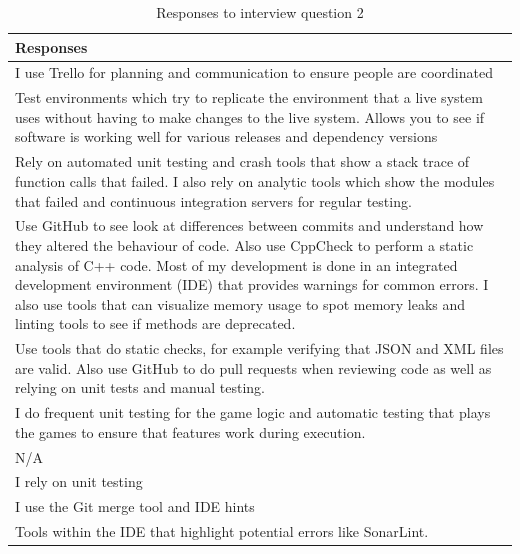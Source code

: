\documentclass[../main.tex]{subfiles}
\begin{document}
\begin{table}[H]
\centering
\caption{Responses to interview question 2}
    \begin{tabular}{|p{15cm}|}
        \hline
        \textbf{Responses}\\ 
        \hline\hline
        I use Trello for planning and communication to ensure people are coordinated\\
        \hline
        Test environments which try to replicate the environment that a live system uses without having to make changes to the live system. Allows you to see if software is working well for various releases and dependency versions\\
        \hline
        Rely on automated unit testing and crash tools that show a stack trace of function calls that failed. I also rely on analytic tools which show the modules that failed and continuous integration servers for regular testing.\\
        \hline
        Use GitHub to see look at differences between commits and understand how they altered the behaviour of code. Also use CppCheck to perform a static analysis of C++ code. Most of my development is done in an integrated development environment (IDE) that provides warnings for common errors. I also use tools that can visualize memory usage to spot memory leaks and linting tools to see if methods are deprecated.\\
        \hline
        Use tools that do static checks, for example verifying that JSON and XML files are valid. Also use GitHub to do pull requests when reviewing code as well as relying on unit tests and manual testing.\\
        \hline
        I do frequent unit testing for the game logic and automatic testing that plays the games to ensure that features work during execution.\\
        \hline
        N/A\\
        \hline
        I rely on unit testing\\
        \hline
        I use the Git merge tool and IDE hints\\
        \hline
        Tools within the IDE that highlight potential errors like SonarLint.\\
        \hline
    \end{tabular}
\label{table:rq4Table2}
\end{table}
\end{document}
